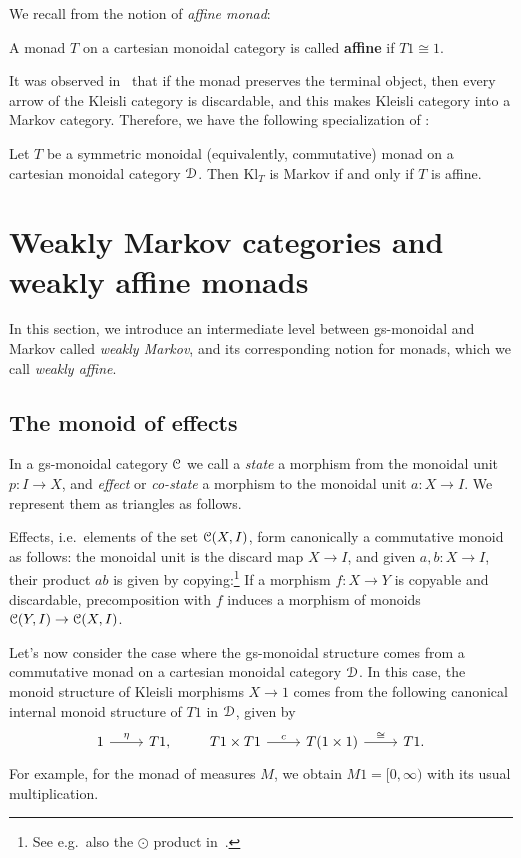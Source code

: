\documentclass[a4paper,UKenglish,numberwithinsect,cleveref, autoref, thm-restate]{lipics-v2021}
\theoremstyle{plain} %
\theoremstyle{definition} %
\begin{document}
We recall from \cite{Kock71,Jacobs1994} the notion of \emph{affine monad}:
\begin{definition}
 A monad $T$ on a cartesian monoidal category is called \textbf{affine} if $T1\cong 1$.
\end{definition}
It was observed in~\cite[Corollary~3.2]{Fritz_2020} that if the monad preserves the terminal object, then every arrow of the Kleisli category is discardable, and this makes Kleisli category into a Markov category. Therefore, we have the following specialization of :
\begin{proposition}\label{affinemarkov}
Let $T$ be a symmetric monoidal (equivalently, commutative) monad on a cartesian monoidal category $\mathcal{D}$. Then $\mathrm{Kl}_T$ is Markov if and only if $T$ is affine.
\end{proposition}
 

\section{Weakly Markov categories and weakly affine monads}

In this section, we introduce an intermediate level between gs-monoidal and Markov called \emph{weakly Markov}, and its corresponding notion for monads, which we call \emph{weakly affine}.
\subsection{The monoid of effects}\label{monoids}

In a gs-monoidal category $\mathcal{C}$ we call a \emph{state} a morphism from the monoidal unit $p:I\to X$, and \emph{effect} or \emph{co-state} a morphism to the monoidal unit $a:X\to I$. We represent them as triangles as follows.

 Effects, i.e.~elements of the set $\mathcal{C}(X,I)$, form canonically a commutative monoid as follows: the monoidal unit is the discard map $X\to I$, and given $a,b:X\to I$, their product $ab$ is given by copying:\footnote{See e.g.~also the $\odot$ product in~\cite[Proposition~3.10]{coecke2011phasegroups}.}
If a morphism $f:X\to Y$ is copyable and discardable, precomposition with $f$ induces a morphism of monoids $\mathcal{C}(Y,I)\to\mathcal{C}(X,I)$. 

Let's now consider the case where the gs-monoidal structure comes from a commutative monad on a cartesian monoidal category $\mathcal{D}$. 
In this case, the monoid structure of Kleisli morphisms $X\to 1$ comes from the following canonical internal monoid structure of $T1$ in $\mathcal{D}$, given by~\cite[Section~10]{kock2012distributions}
 \[
 \begin{tikzcd}
  1 \ar{r}{\eta} & T1 ,
 \end{tikzcd}
 \qquad
 \begin{tikzcd}
  T1 \times T1 \ar{r}{c} & T(1\times 1) \ar{r}{\cong} & T1 .
 \end{tikzcd}
 \]
 For example, for the monad of measures $M$, we obtain $M1=[0,\infty)$ with its usual multiplication.
 
\end{document}
